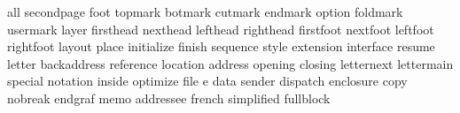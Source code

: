 \startinterface all
    {secondpage}
          {foot}
       {topmark}
       {botmark}
       {cutmark}
       {endmark}
        {option}
      {foldmark}
      {usermark}
         {layer}
     {firsthead}
      {nexthead}
      {lefthead}
     {righthead}
     {firstfoot}
      {nextfoot}
      {leftfoot}
     {rightfoot}
        {layout}
         {place}
    {initialize}
        {finish}
      {sequence}
         {style}
     {extension}
     {interface}
        {resume}
        {letter}
   {backaddress}
     {reference}
      {location}
       {address}
       {opening}
       {closing}
    {letternext}
    {lettermain}
       {special}
      {notation}
        {inside}
      {optimize}
          {file}
             {e}
          {data}
        {sender}
      {dispatch}
     {enclosure}
          {copy}
       {nobreak}
       {endgraf}
          {memo}
     {addressee}
        {french}
    {simplified}
     {fullblock}

